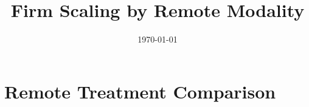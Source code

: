 \documentclass{article}
\title{Firm Scaling by Remote Modality}
\author{}
\date{\today}
\begin{document}
\maketitle

\section*{Remote Treatment Comparison}

\end{document}
